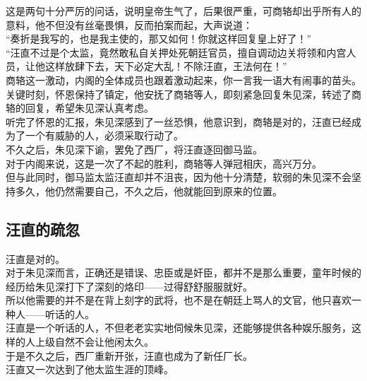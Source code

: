 \begin{multicols}{\theparacolNo}
这是两句十分严厉的问话，说明皇帝生气了，后果很严重，可商辂却出乎所有人的意料，他不但没有丝毫畏惧，反而拍案而起，大声说道：\\

“奏折是我写的，也是我主使的，那又如何！你就这样回复皇上好了！”\\

“汪直不过是个太监，竟然敢私自关押处死朝廷官员，擅自调动边关将领和内宫人员，让他这样放肆下去，天下必定大乱！不除汪直，王法何在！”\\

商辂这一激动，内阁的全体成员也跟着激动起来，你一言我一语大有闹事的苗头。\\

关键时刻，怀恩保持了镇定，他安抚了商辂等人，即刻紧急回复朱见深，转述了商辂的回复，希望朱见深认真考虑。\\

听完了怀恩的汇报，朱见深感到了一丝恐惧，他意识到，商辂是对的，汪直已经成为了一个有威胁的人，必须采取行动了。\\

不久之后，朱见深下谕，罢免了西厂，将汪直逐回御马监。\\

对于内阁来说，这是一次了不起的胜利，商辂等人弹冠相庆，高兴万分。\\

但与此同时，御马监太监汪直却并不沮丧，因为他十分清楚，软弱的朱见深不会坚持多久，他仍然需要自己，不久之后，他就能回到原来的位置。\\

\subsection{汪直的疏忽}
汪直是对的。\\

对于朱见深而言，正确还是错误、忠臣或是奸臣，都并不是那么重要，童年时候的经历给朱见深打下了深刻的烙印——过得舒舒服服就好。\\

所以他需要的并不是在背上刻字的武将，也不是在朝廷上骂人的文官，他只喜欢一种人——听话的人。\\

汪直是一个听话的人，不但老老实实地伺候朱见深，还能够提供各种娱乐服务，这样的人上级自然不会让他闲太久。\\

于是不久之后，西厂重新开张，汪直也成为了新任厂长。\\

汪直又一次达到了他太监生涯的顶峰。\\


\end{multicols}
